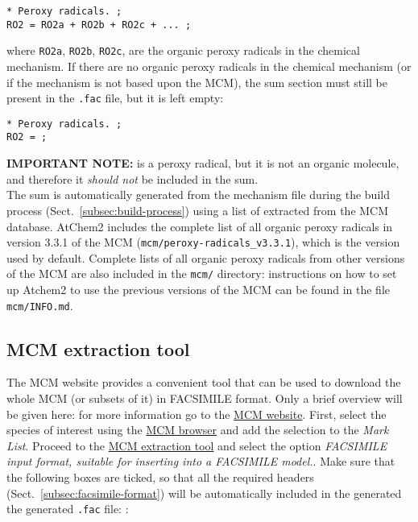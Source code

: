 \begin{verbatim}
* Peroxy radicals. ;
RO2 = RO2a + RO2b + RO2c + ... ;
\end{verbatim}

where \texttt{RO2a}, \texttt{RO2b}, \texttt{RO2c}, are the organic
peroxy radicals in the chemical mechanism. If there are no organic
peroxy radicals in the chemical mechanism (or if the mechanism is not
based upon the MCM), the  sum section must still be present in
the \texttt{.fac} file, but it is left empty:

\begin{verbatim}
* Peroxy radicals. ;
RO2 = ;
\end{verbatim}

\textbf{IMPORTANT NOTE:}  is a peroxy radical, but it is not an
organic molecule, and therefore it \emph{should not} be included in
the  sum.\\

The  sum is automatically generated from the mechanism file
during the build process (Sect.~\ref{subsec:build-process}) using a
list of  extracted from the MCM database. AtChem2 includes the
complete list of all organic peroxy radicals in version 3.3.1 of the
MCM (\texttt{mcm/peroxy-radicals\_v3.3.1}), which is the version used
by default. Complete lists of all organic peroxy radicals from other
versions of the MCM are also included in the \texttt{mcm/} directory:
instructions on how to set up Atchem2 to use the previous versions of
the MCM can be found in the file \texttt{mcm/INFO.md}.

\subsection{MCM extraction tool} \label{subsec:mcm-extraction-tool}

The MCM website provides a convenient tool that can be used to
download the whole MCM (or subsets of it) in FACSIMILE
format. Only a brief overview will be given here: for more information
go to the \href{http://mcm.leeds.ac.uk/}{MCM website}. First, select the species
of interest using the \href{http://mcm.leeds.ac.uk/MCM/roots.htt}{MCM browser}
and add the selection to the \emph{Mark List}. Proceed to the
\href{http://mcm.leeds.ac.uk/MCM/extract.htt}{MCM extraction tool}
and select the option \emph{FACSIMILE input format, suitable for
  inserting into a FACSIMILE model.}. Make sure that the following
boxes are ticked, so that all the required headers
(Sect.~\ref{subsec:facsimile-format}) will be automatically included
in the generated the generated \texttt{.fac} file: :

